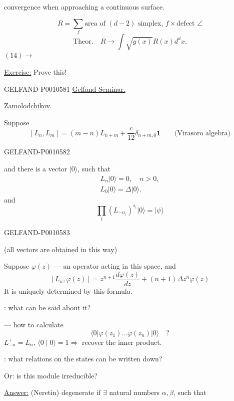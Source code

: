  convergence when approaching a continuous surface.

\[
R=\sum_f\text{area of }(d-2)\text{ simplex, }f\times\text{defect }\angle
\]
\begin{equation*}
\underline{\text{Theor.}}\quad R\longrightarrow\int\sqrt{g(x)}R(x)d^dx.
\tag{15}
\end{equation*}
\((14)\longrightarrow\) 

\underline{Exercise:} Prove this!


\begin{GelfandAdjacentEvidence}{GELFAND-P001058}{1}
\qquad\underline{Gelfand Seminar.}

\underline{Zamolodchikov.}

Suppose
\[
[L_n,L_m]=(m-n)L_{n+m}+\frac{c}{12}\delta_{n+m,0}\mathbf1
  \qquad\text{(Virasoro algebra)}
\]
\end{GelfandAdjacentEvidence}
\begin{GelfandAdjacentEvidence}{GELFAND-P001058}{2}

and there is a vector \(\lvert0\rangle\), such that
\begin{gather*}
L_n\lvert0\rangle=0,\quad n>0,\\
L_0\lvert0\rangle=\Delta\lvert0\rangle.
\end{gather*}
and
\[
\prod_i(L_{-n_i})^{s_i}\lvert0\rangle=\lvert\psi\rangle
\]
\end{GelfandAdjacentEvidence}
\begin{GelfandAdjacentEvidence}{GELFAND-P001058}{3}

(all vectors are obtained in this way)

Suppose \(\varphi(z)\) — an operator acting in this space, and
\[
[L_n,\varphi(z)]=z^{n+1}\frac{d\varphi(z)}{dz}+(n+1)\Delta z^n\varphi(z)
\]
It is uniquely determined by this formula.

: what can be said about it?

— how to calculate
\[
\langle0\lvert\varphi(z_1)\ldots\varphi(z_n)\rvert0\rangle\quad ?
\]
\(L_{-n}^{+}=L_n\), \(\langle0\mid0\rangle=1\Rightarrow\) recover the inner product.

: what relations on the states can be written down?

Or: is this module irreducible?

\underline{Answer:} (Neretin) degenerate if \(\exists\) natural numbers \(\alpha,\beta\), such that
\end{GelfandAdjacentEvidence}
